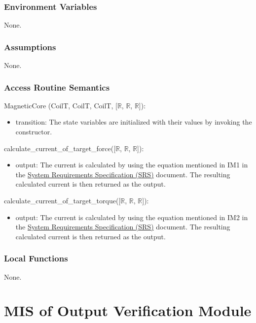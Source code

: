 \documentclass[12pt, titlepage]{article}
\begin{document}
\subsubsection{Environment Variables}
None.
\subsubsection{Assumptions}
None.

\subsubsection{Access Routine Semantics}

\noindent MagneticCore (CoilT, CoilT, CoilT, [$\mathbb{R}$, $\mathbb{R}$, $\mathbb{R}$]):
\begin{itemize}
\item transition: The state variables are initialized with their values by invoking the constructor.
\end{itemize}

\noindent calculate\_current\_of\_target\_force([$\mathbb{R}$, $\mathbb{R}$, $\mathbb{R}$]):
\begin{itemize}    
\item output: The current is calculated by using the equation mentioned in IM1 in the \href{https://github.com/rnorouziani/3D-H3C/blob/main/docs/SRS/SRS.pdf}{System Requirements Specification (SRS)} document. The resulting calculated current is then returned as the output.
\end{itemize}

\noindent calculate\_current\_of\_target\_torque([$\mathbb{R}$, $\mathbb{R}$, $\mathbb{R}$]):
\begin{itemize}
\item output: The current is calculated by using the equation mentioned in IM2 in the \href{https://github.com/rnorouziani/3D-H3C/blob/main/docs/SRS/SRS.pdf}{System Requirements Specification (SRS)} document. The resulting calculated current is then returned as the output.
\end{itemize}

\subsubsection{Local Functions}
None.
\section{MIS of Output Verification Module} \label{MOV}
\end{document}
